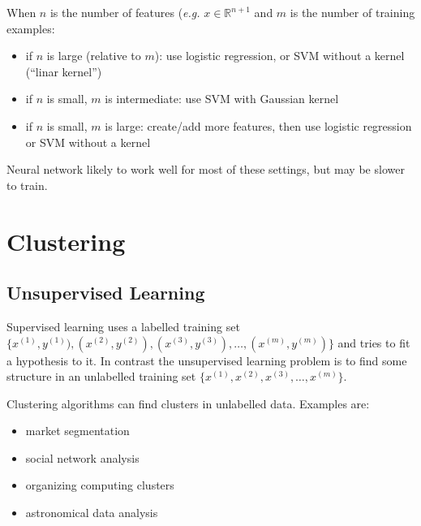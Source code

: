 \documentclass[a4paper,twoside,10pt]{article}
\begin{document}
When $n$ is the number of features (\emph{e.g.} $x\in\mathbb{R}^{n+1}$ and
$m$ is the number of training examples:
\begin{itemize}
  \item if $n$ is large (relative to $m$): use logistic regression, or \ac{SVM} without a kernel (``linar kernel'')
  \item if $n$ is small, $m$ is intermediate: use \ac{SVM} with Gaussian kernel
  \item if $n$ is small, $m$ is large: create/add more features, then use logistic regression or \ac{SVM} without a kernel
\end{itemize}
Neural network likely to work well for most of these settings, but may be slower to train.

\section{Clustering}
\subsection{Unsupervised Learning}
Supervised learning uses a labelled training set
$\{x^{(1)},y^{(1)}),(x^{(2)},y^{(2)}),(x^{(3)},y^{(3)}),\ldots,(x^{(m)},y^{(m)})\}$
and tries to fit a hypothesis to it.
In contrast the unsupervised learning problem is to find some structure in an unlabelled training set
$\{x^{(1)},x^{(2)},x^{(3)},\ldots,x^{(m)}\}$.

Clustering algorithms can find clusters in unlabelled data. Examples are:
\begin{itemize}
  \item market segmentation
  \item social network analysis
  \item organizing computing clusters
  \item astronomical data analysis
\end{itemize}
\end{document}
